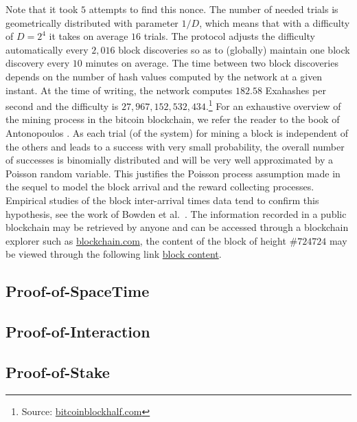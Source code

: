 Note that it took $5$ attempts to find this nonce. The number of needed trials is geometrically distributed with parameter $1 / D$, which means that with a difficulty of $D = 2^4$ it takes on average $16$ trials. The protocol adjusts the difficulty automatically every $2,016$ block discoveries so as to (globally) maintain one block discovery every $10$ minutes on average. The time between two block discoveries depends on the number of hash values computed by the network at a given instant. At the time of writing, the network computes $182.58$ Exahashes per second and the difficulty is $27,967,152,532,434$.\footnote{Source: \href{https://www.bitcoinblockhalf.com/}{bitcoinblockhalf.com}} For an exhaustive overview of the mining process in the bitcoin blockchain, we refer the reader to the book of Antonopoulos \citet[Chapter 10]{Antonopoulos2017}. As each trial (of the system) for mining a block is
independent of the others and leads to a success with very small probability, the overall
number of successes is binomially distributed and will be very well approximated by a
Poisson random variable. This justifies the Poisson process assumption made in the sequel to model the block arrival and the reward collecting processes. Empirical studies of the block inter-arrival times data tend to confirm this hypothesis, see the work of Bowden et al.\ \citet{Bowden2020}. The information recorded in a public blockchain may be retrieved by anyone and can be accessed through a blockchain explorer such as \href{https://www.blockchain.com/}{blockchain.com}, the content of the block of height $\#724724$ may be viewed through the following link \href{https://www.blockchain.com/btc/block/0000000000000000000954d42e8ced7017448cb9f39b364e371a1eec6e34463b}{block content}. 
\subsection{Proof-of-SpaceTime}\label{ssec:posp}
\subsection{Proof-of-Interaction}\label{ssec:poi}
\subsection{Proof-of-Stake}\label{ssec:pos}

